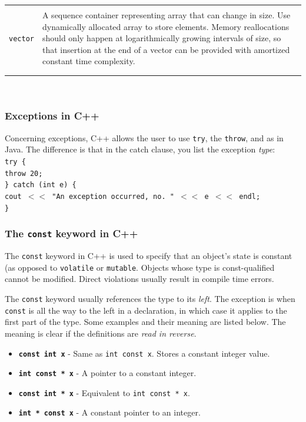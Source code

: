 \begin{tabular}{p{}p{}}
\hfill \\
\texttt{vector} & A sequence container representing array that can change in size. Use dynamically allocated array to store elements. Memory reallocations should only happen at logarithmically growing intervals of size, so that insertion at the end of a vector can be provided with amortized constant time complexity. \\
\hfill \\
\label{tab:cpp_structures}
\end{tabular} \\

\subsubsection{Exceptions in C++}

Concerning exceptions, C++ allows the user to use \texttt{try}, the \texttt{throw}, and  as in Java. The difference is that in the catch clause, you list the exception \textit{type}: \\

\indent \texttt{try \{} \\
\indent \indent \texttt{throw 20;} \\
\indent \texttt{\} catch (int e) \{} \\
\indent \indent \texttt{cout $<<$ "An exception occurred, no. " $<<$ e $<<$ endl;} \\
\indent \texttt{\}} \\

\subsubsection{The \texttt{const} keyword in C++}

The \texttt{const} keyword in C++ is used to specify that an object's state is constant (as opposed to \texttt{volatile} or \texttt{mutable}. Objects whose type is const-qualified cannot be modified. Direct violations usually result in compile time errors.

The \texttt{const} keyword usually references the type to its \textit{left}. The exception is when \texttt{const} is all the way to the left in a declaration, in which case it applies to the first part of the type. Some examples and their meaning are listed below. The meaning is clear if the definitions are \textit{read in reverse}.

\begin{itemize}
	\item \textbf{\texttt{const int x}} - Same as \texttt{int const x}. Stores a constant integer value.
	\item \textbf{\texttt{int const * x}} - A pointer to a constant integer.
	\item \textbf{\texttt{const int * x}} - Equivalent to \texttt{int const * x}.
	\item \textbf{\texttt{int * const x}} - A constant pointer to an integer.
\end{itemize}

